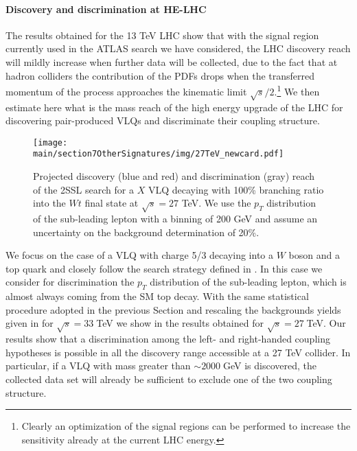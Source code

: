 \paragraph*{Discovery and discrimination at HE-LHC}

The results obtained for the 13 TeV LHC show that with the signal region currently used in the ATLAS search we have considered, the LHC discovery reach will mildly increase when further data will be collected, due to the fact that at hadron colliders the contribution of the PDFs drops when the transferred momentum of the process approaches the kinematic limit $\sqrt{s}/2$.\footnote{Clearly an optimization of the signal regions can be performed to increase the sensitivity already at the current LHC energy.}
We then estimate here what is the mass reach of the high energy upgrade of the LHC for discovering pair-produced VLQs and discriminate their coupling structure.

\begin{figure}
\begin{center}
\texttt{[image: \\main/section7OtherSignatures/img/27TeV\_newcard.pdf]}
\caption{Projected discovery (blue and red) and discrimination (gray)  reach of the 2SSL search for a $X$ VLQ decaying with 100\% branching ratio into the $Wt$ final state at $\sqrt{s}=27$ TeV. We use the $p_T$ distribution of the sub-leading lepton with a binning of 200 GeV and assume an uncertainty on the background determination of 20\%.\label{fig:33Lumi_2}}
\end{center}
\end{figure}

We focus on the case of a VLQ with charge 5/3 decaying into a $W$ boson and a top quark and closely follow the search strategy defined in . In this case we consider for discrimination the $p_T$ distribution of the sub-leading lepton, which is almost always coming from the SM top decay. With the same statistical procedure adopted in the previous Section and rescaling the backgrounds yields given in  for $\sqrt{s}=33\;$TeV we show in  the results obtained for $\sqrt{s}=27\;$TeV. Our results show that a discrimination among the left- and right-handed coupling hypotheses is possible in all the discovery range accessible at a 27 TeV collider. In particular, if a VLQ with mass greater than $\sim 2000\;$GeV is discovered, the collected data set will already be sufficient to exclude one of the two coupling structure. 

